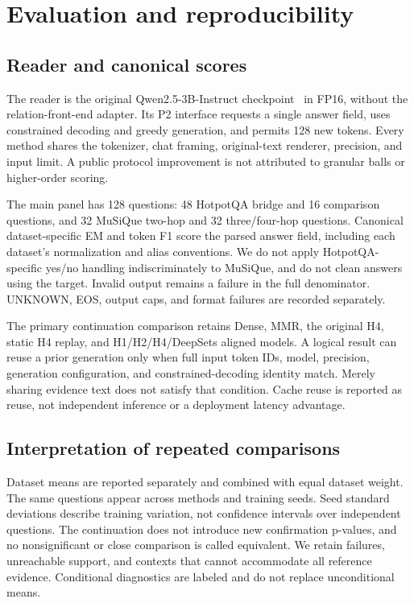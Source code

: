 \documentclass[pdflatex,sn-mathphys-num]{sn-jnl}
\begin{document}
\section{Evaluation and reproducibility}
\subsection{Reader and canonical scores}
The reader is the original Qwen2.5-3B-Instruct checkpoint~\cite{qwen2024release} in FP16, without
the relation-front-end adapter. Its P2 interface requests a single answer
field, uses constrained decoding and greedy generation, and permits 128
new tokens. Every method shares the tokenizer, chat framing, original-text
renderer, precision, and input limit. A public protocol improvement is not
attributed to granular balls or higher-order scoring.

The main panel has 128 questions: 48 HotpotQA bridge and 16 comparison
questions, and 32 MuSiQue two-hop and 32 three/four-hop questions. Canonical
dataset-specific EM and token F1 score the parsed answer field, including
each dataset's normalization and alias conventions. We do not apply
HotpotQA-specific yes/no handling indiscriminately to MuSiQue, and do not
clean answers using the target. Invalid output remains a failure in the
full denominator. UNKNOWN, EOS, output caps, and format failures are
recorded separately.

The primary continuation comparison retains Dense, MMR, the original H4,
static H4 replay, and H1/H2/H4/DeepSets aligned models. A logical result
can reuse a prior generation only when full input token IDs, model,
precision, generation configuration, and constrained-decoding identity
match. Merely sharing evidence text does not satisfy that condition.
Cache reuse is reported as reuse, not independent inference or a deployment
latency advantage.

\subsection{Interpretation of repeated comparisons}
Dataset means are reported separately and combined with equal dataset
weight. The same questions appear across methods and training seeds.
Seed standard deviations describe training variation, not confidence
intervals over independent questions. The continuation does not introduce
new confirmation p-values, and no nonsignificant or close comparison is
called equivalent. We retain failures, unreachable support, and contexts
that cannot accommodate all reference evidence. Conditional diagnostics
are labeled and do not replace unconditional means.
\end{document}
